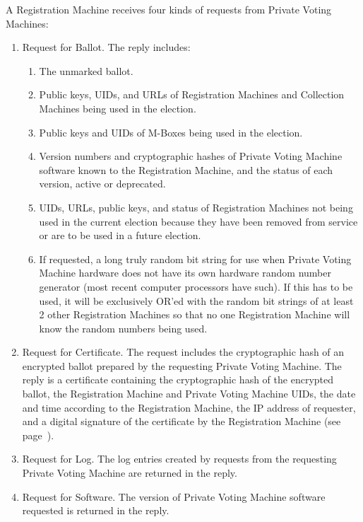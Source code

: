 \documentclass[12pt]{article}
\newcommand{\pagref}[1]{(see page~\pageref{#1})}
\begin{document}
A Registration Machine receives four kinds of requests from
Private Voting Machines:
\begin{enumerate}

\item
Request for Ballot.  The reply includes:
\begin{enumerate}
\item The unmarked ballot.
\item Public keys, UIDs, and URLs
      of Registration Machines and Collection Machines being used
      in the election.
\item Public keys and UIDs of M-Boxes being used in the election.
\item Version numbers and cryptographic hashes
      of Private Voting Machine software
      known to the Registration Machine, and
      the status of each version, active or deprecated.
\item UIDs, URLs, public keys, and status of Registration Machines not
      being used in the current election because they have been removed
      from service or are to be used in a future election.
\item If requested, a long truly random bit string for use when
      Private Voting Machine hardware does not have its own hardware
      random number generator (most recent computer processors have
      such).  If this has to be used, it will be exclusively OR'ed with
      the random bit strings of at least 2 other Registration Machines
      so that no one Registration Machine will know the random numbers being
      used.
\end{enumerate}

\item
Request for Certificate.  The request includes the cryptographic hash
of an encrypted ballot prepared by the requesting Private
Voting Machine.  The reply is a certificate containing
the cryptographic hash of the encrypted ballot,
the Registration Machine and Private Voting Machine UIDs,
the date and time according to the Registration Machine,
the IP address of requester,
and a digital signature of the certificate by the Registration Machine
\pagref{CERTIFICATE-DETAILS}.

\item
Request for Log.  The log entries created by requests from the
requesting Private Voting Machine are returned in the reply.

\item
Request for Software.  The version of Private Voting Machine software
requested is returned in the reply.

\end{enumerate}
\end{document}
